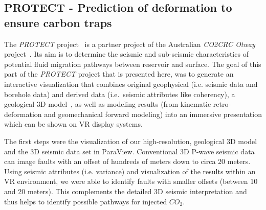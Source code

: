\documentclass[twocolumn]{svjour3}          %
\begin{document}

\subsection{PROTECT - Prediction of deformation to ensure carbon traps}
\label{otway-basin---co2-storage}

The \emph{PROTECT} project~\cite{krawczyk:deformation} is a partner project of the Australian \emph{CO2CRC Otway} project~\cite{cook:carbon}. Its aim is to determine the seismic and sub-seismic characteristics of potential fluid migration pathways between reservoir and surface. The goal of this part of the \emph{PROTECT} project that is presented here, was to generate an interactive visualization that combines original geophysical (i.e. seismic data and borehole data) and derived data (i.e.~seismic attributes like coherency), a geological 3D model~\cite{ziesch:geology}, as well as modeling results (from kinematic retro-deformation and geomechanical forward modeling) into an immersive presentation which can be shown on VR display systems.

The first steps were the visualization of our high-resolution, geological 3D model and the 3D seismic data set in ParaView. Conventional 3D P-wave seismic data can image faults with an offset of hundreds of meters down to circa 20 meters. Using seismic attributes (i.e. variance) and visualization of the results within an VR environment, we were able to identify faults with smaller offsets (between 10 and 20 meters). This complements the detailed 3D seismic interpretation and thus helps to identify possible pathways for injected $CO_{2}$.
\end{document}
